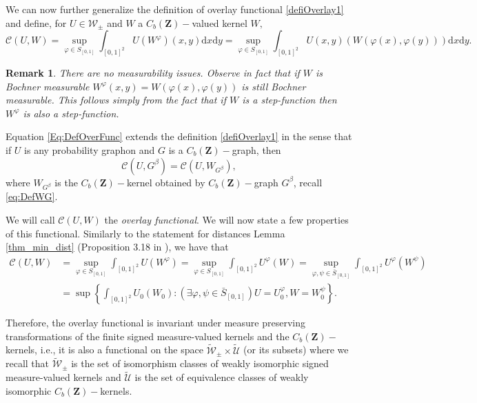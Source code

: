 \documentclass[11pt]{article}
\newtheorem{remark}[theorem]{Remark}
\newcommand{\cU}{{\mathcal U}}  %
\newcommand{\Space}{\mathbf{Z}}
\newcommand{\signed}{\pm}
\newcommand{\CbFunct}{C_b(\Space)}
\newcommand{\Kernel}{\mathcal{W}_{\signed}}
\newcommand{\UKernel}{\widetilde{\mathcal{W}}_{\signed}}
\begin{document}
We can now further generalize the definition of overlay functional \eqref{defiOverlay1} and define, for $U\in \Kernel$ and $W$ a $\CbFunct-$valued kernel $W,$
\begin{equation}\label{Eq:DefOverFunc}
\mathcal{C}(U, W)=\sup _{\varphi \in S_{[0,1]}} \int_{[0,1]^2}U(W^{\varphi})(x,y) \mathrm{d}x \mathrm{d}y=\sup _{\varphi \in S_{[0,1]}} \int_{[0,1]^2} U(x, y) (W(\varphi(x), \varphi(y))) \mathrm{d}x \mathrm{d}y. 
\end{equation}
\begin{remark}
There are no measurability issues. Observe in fact that if $W$ is Bochner measurable $W^{\varphi}(x,y)=W(\varphi(x), \varphi(y))$ is still Bochner measurable. This follows simply from the fact that if $W$ is a step-function then $W^{\varphi}$ is also a step-function.
\end{remark}

Equation \eqref{Eq:DefOverFunc} extends the definition \eqref{defiOverlay1} in the sense that if $U$ is any probability graphon and $G$ is a $\CbFunct-$graph, then
\begin{equation}\label{eq:IdentOverlayGraphGraphon}
\mathcal{C}(U, G^{\beta})=\mathcal{C}\left(U, W_{G^{\beta}}\right),
\end{equation}
where $W_{G^{\beta}}$ is the $\CbFunct-$kernel obtained by $\CbFunct-$graph $G^{\beta}$, recall \eqref{eq:DefWG}. 


We will call  $\mathcal{C}(U, W)$ the \emph{overlay functional}. We will now state a few properties of this functional. Similarly to the statement for distances Lemma \ref{thm_min_dist} (Proposition 3.18 in \cite{abraham2023probabilitygraphons}), we have that
$$
\begin{aligned}
\mathcal{C}(U, W) & =\sup _{\varphi \in S_{[0,1]}} \int_{[0,1]^2}U( W^{\varphi})=\sup _{\varphi \in S_{[0,1]}}\int_{[0,1]^2} U^{\varphi}( W)=\sup _{\varphi, \psi \in \bar{S}_{[0,1]}} \int_{[0,1]^2}U^{\varphi}( W^\psi) \\
& =\sup \left\{ \int_{[0,1]^2}U_0(W_0) :\left(\exists \varphi, \psi \in \bar{S}_{[0,1]}\right) U=U_0^{\varphi}, W=W_0^\psi\right\} .
\end{aligned}
$$

Therefore, the overlay functional is invariant under measure preserving transformations of the finite signed measure-valued kernels and the $\CbFunct-$kernels, i.e., it is also a functional on the space $\UKernel \times \widetilde{\cU}$ (or its subsets) where we recall that $\UKernel$ is the set of isomorphism classes of weakly isomorphic signed measure-valued kernels and $\widetilde{\cU}$ is the set of equivalence classes of weakly isomorphic $\CbFunct-$kernels. 
\end{document}
